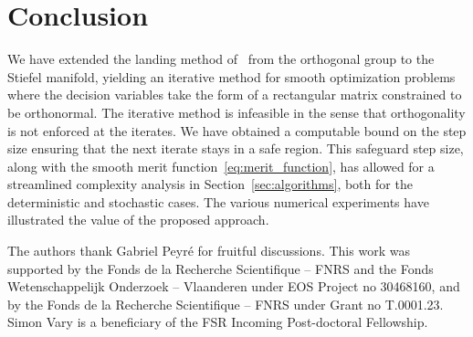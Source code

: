 \documentclass[twoside,11pt]{article}
\begin{document}
\section*{Conclusion}
We have extended the landing method of~\cite{ablin2022fast} from the orthogonal group to the Stiefel manifold, yielding an iterative method for smooth optimization problems where the decision variables take the form of a rectangular matrix constrained to be orthonormal. The iterative method is infeasible in the sense that orthogonality is not enforced at the iterates. We have obtained a computable bound on the step size ensuring that the next iterate stays in a safe region. This safeguard step size, along with the smooth merit function~\eqref{eq:merit_function}, has allowed for a streamlined complexity analysis in Section~\ref{sec:algorithms}, both for the deterministic and stochastic cases. The various numerical experiments have illustrated the value of the proposed approach.



%
%



%
%

\acks{}
The authors thank Gabriel Peyré for fruitful discussions.
This work was supported by the Fonds de la Recherche Scientifique -- FNRS and the Fonds Wetenschappelijk Onderzoek -- Vlaanderen under EOS Project no 30468160, and by the Fonds de la Recherche Scientifique -- FNRS under Grant no T.0001.23. Simon Vary is a beneficiary of the FSR Incoming Post-doctoral Fellowship.
\newpage

%
%



%
%

%
%

%
%

%
%
%
%
%
%
%
%
%
%
%

%
%
%
%
%
%
%
%
%

%


\vskip 0.2in


\newpage
\appendix
\end{document}
